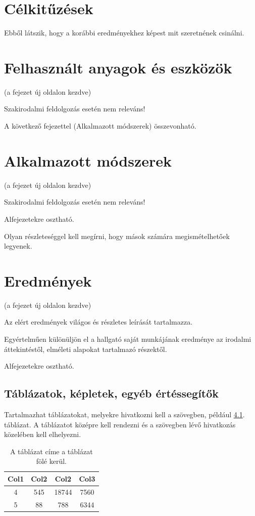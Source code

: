\documentclass[a4paper,12pt]{report}
\theoremstyle{definition}
\theoremstyle{remark}
\begin{document}
\chapter{Célkitűzések}

Ebből látszik, hogy a korábbi eredményekhez képest mit szeretnének csinálni.

\chapter{Felhasznált anyagok és eszközök}

(a fejezet új oldalon kezdve) 

Szakirodalmi feldolgozás esetén nem releváns!

A következő fejezettel (Alkalmazott módszerek) összevonható.

\chapter{Alkalmazott módszerek}

(a fejezet új oldalon kezdve) 

Szakirodalmi feldolgozás esetén nem releváns!


Alfejezetekre osztható. 

Olyan részleteséggel kell megírni, hogy mások számára megismételhetőek legyenek.

\chapter{Eredmények}

(a fejezet új oldalon kezdve) 

Az elért eredmények világos és részletes leírását tartalmazza. 

Egyértelműen különüljön el a hallgató saját munkájának eredménye az irodalmi áttekintéstől, elméleti alapokat tartalmazó részektől.

Alfejezetekre osztható.

\section{Táblázatok, képletek, egyéb értéssegítők}

Tartalmazhat táblázatokat, melyekre hivatkozni kell a szövegben, például \ref{table:2}. táblázat. A táblázatot középre kell rendezni és a szövegben lévő hivatkozás közelében kell elhelyezni.

\begin{table}[h!]
\centering
\caption{A táblázat címe a táblázat fölé kerül.}
\label{table:2}
\vspace{.2 cm}
\begin{tabular}{||c c c c||} 
 \hline
 Col1 & Col2 & Col2 & Col3 \\ [0.5ex] 
 \hline\hline
  4 & 545 & 18744 & 7560 \\
 5 & 88 & 788 & 6344 \\ [1ex] 
 \hline
\end{tabular}
\end{table}
\end{document}

